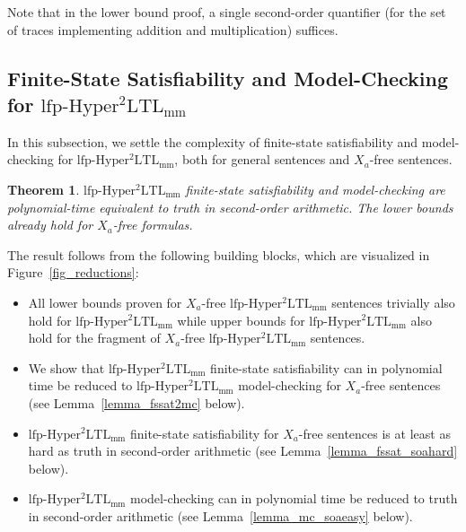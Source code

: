 \documentclass[dvipsnames,10pt,a4paper]{amsart}
\newtheorem{thm}{Theorem}[section]
\theoremstyle{definition}
\theoremstyle{remark}
\newcommand{\lfpsohyltlfp}{\mathrm{lfp\text{-}{Hyper^2LTL_{\mathrm{mm}}}}\xspace}
\newcommand{\univar}{X_a}
\begin{document}
Note that in the lower bound proof, a single second-order quantifier (for the set of traces implementing addition and multiplication) suffices. 

\subsection{\texorpdfstring{Finite-State Satisfiability and Model-Checking for \boldmath$\lfpsohyltlfp$}{Finite-State Satisfiability and Model-Checking for Second-order HyperLTL with Least Fixed Points}}

In this subsection, we settle the complexity of finite-state satisfiability and model-checking for $\lfpsohyltlfp$, both for general sentences and $\univar$-free sentences.


\begin{thm}
\label{thm_fssatmccomplexity_lfp}
$\lfpsohyltlfp$ finite-state satisfiability and model-checking are poly\-nomial-time equivalent to truth in second-order arithmetic. The lower bounds already hold for $\univar$-free formulas.
\end{thm}



The result follows from the following building blocks, which are visualized in Figure~\ref{fig_reductions}:

\begin{itemize}
    \item All lower bounds proven for $\univar$-free $\lfpsohyltlfp$ sentences trivially also hold for $\lfpsohyltlfp$ while upper bounds for $\lfpsohyltlfp$ also hold for the fragment of $\univar$-free $\lfpsohyltlfp$ sentences.
    \item We show that $\lfpsohyltlfp$ finite-state satisfiability can in polynomial time be reduced to $\lfpsohyltlfp$ model-checking for $\univar$-free sentences (see Lemma~\ref{lemma_fssat2mc} below).
    \item $\lfpsohyltlfp$ finite-state satisfiability for $\univar$-free sentences is at least as hard as truth in second-order arithmetic (see Lemma~\ref{lemma_fssat_soahard} below).
    \item $\lfpsohyltlfp$ model-checking can in polynomial time be reduced to truth in second-order arithmetic (see Lemma~\ref{lemma_mc_soaeasy} below).
\end{itemize}
\end{document}
